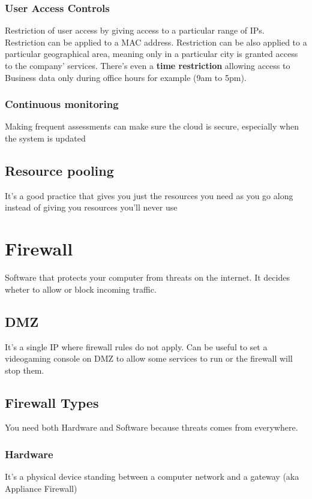\documentclass[a4paper,12pt]{book}
\begin{document}
\subsection{User Access Controls}
Restriction of user access by giving access to a particular range of IPs. Restriction can be applied to a MAC address. Restriction can be also applied to a particular geographical area, meaning only in a particular city is granted access to the company' services. There's even a \textbf{time restriction} allowing access to Business data only during office hours for example (9am to 5pm).
\subsection{Continuous monitoring}
Making frequent assessments can make sure the cloud is secure, especially when the system is updated 
\section{Resource pooling}
It's a good practice that gives you just the resources you need as you go along instead of giving you resources you'll never use
\clearpage
\printindex

\chapter{Firewall}
Software that protects your computer from threats on the internet. It decides wheter to allow or block incoming traffic.
\section{DMZ}
It's a single IP where firewall rules do not apply. Can be useful to set a videogaming console on DMZ to allow some services to run or the firewall will stop them. 
\section{Firewall Types}
You need both Hardware and Software because threats comes from everywhere. %
\subsection{Hardware}
It's a physical device standing between a computer network and a gateway (aka Appliance Firewall)
\end{document}
